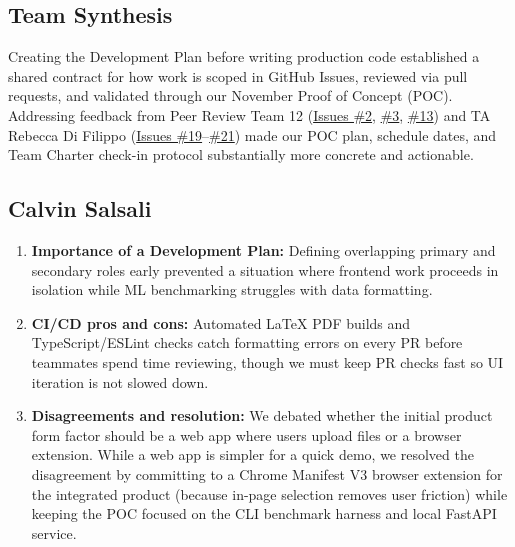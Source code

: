 \documentclass{article}
\begin{document}
\subsection*{Team Synthesis}
Creating the Development Plan before writing production code established a shared contract for how work is scoped in GitHub Issues, reviewed via pull requests, and validated through our November Proof of Concept (POC). Addressing feedback from Peer Review Team 12 (\href{https://github.com/richy1337/Verity/issues/2}{Issues \#2}, \href{https://github.com/richy1337/Verity/issues/3}{\#3}, \href{https://github.com/richy1337/Verity/issues/13}{\#13}) and TA Rebecca Di Filippo (\href{https://github.com/richy1337/Verity/issues/19}{Issues \#19}--\href{https://github.com/richy1337/Verity/issues/21}{\#21}) made our POC plan, schedule dates, and Team Charter check-in protocol substantially more concrete and actionable.

\subsection*{Calvin Salsali}
\begin{enumerate}[leftmargin=*]
    \item \textbf{Importance of a Development Plan:} Defining overlapping primary and secondary roles early prevented a situation where frontend work proceeds in isolation while ML benchmarking struggles with data formatting.
    \item \textbf{CI/CD pros and cons:} Automated \LaTeX{} PDF builds and TypeScript/ESLint checks catch formatting errors on every PR before teammates spend time reviewing, though we must keep PR checks fast so UI iteration is not slowed down.
    \item \textbf{Disagreements and resolution:} We debated whether the initial product form factor should be a web app where users upload files or a browser extension. While a web app is simpler for a quick demo, we resolved the disagreement by committing to a Chrome Manifest V3 browser extension for the integrated product (because in-page selection removes user friction) while keeping the POC focused on the CLI benchmark harness and local FastAPI service.
\end{enumerate}
\end{document}
